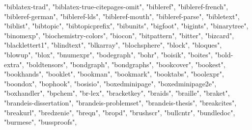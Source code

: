 \documentclass[
]{article}
\newenvironment{Shaded}{\begin{snugshade}}{\end{snugshade}}
\newcommand{\NormalTok}[1]{#1}
\newcommand{\StringTok}[1]{\textcolor[rgb]{0.31,0.60,0.02}{#1}}
\begin{document}
\begin{Shaded}
\begin{Highlighting}[]
\StringTok{"biblatex{-}trad"}\NormalTok{, }\StringTok{"biblatex{-}true{-}citepages{-}omit"}\NormalTok{, }\StringTok{"bibleref"}\NormalTok{, }
\StringTok{"bibleref{-}french"}\NormalTok{, }\StringTok{"bibleref{-}german"}\NormalTok{, }\StringTok{"bibleref{-}lds"}\NormalTok{, }\StringTok{"bibleref{-}mouth"}\NormalTok{, }
\StringTok{"bibleref{-}parse"}\NormalTok{, }\StringTok{"bibletext"}\NormalTok{, }\StringTok{"biblist"}\NormalTok{, }\StringTok{"bibtopic"}\NormalTok{, }\StringTok{"bibtopicprefix"}\NormalTok{, }
\StringTok{"bibunits"}\NormalTok{, }\StringTok{"bigfoot"}\NormalTok{, }\StringTok{"bigints"}\NormalTok{, }\StringTok{"binarytree"}\NormalTok{, }\StringTok{"binomexp"}\NormalTok{, }\StringTok{"biochemistry{-}colors"}\NormalTok{, }
\StringTok{"biocon"}\NormalTok{, }\StringTok{"bitpattern"}\NormalTok{, }\StringTok{"bitter"}\NormalTok{, }\StringTok{"bizcard"}\NormalTok{, }\StringTok{"blacklettert1"}\NormalTok{, }
\StringTok{"blindtext"}\NormalTok{, }\StringTok{"blkarray"}\NormalTok{, }\StringTok{"blochsphere"}\NormalTok{, }\StringTok{"block"}\NormalTok{, }\StringTok{"bloques"}\NormalTok{, }\StringTok{"blowup"}\NormalTok{, }
\StringTok{"blox"}\NormalTok{, }\StringTok{"bnumexpr"}\NormalTok{, }\StringTok{"bodegraph"}\NormalTok{, }\StringTok{"bohr"}\NormalTok{, }\StringTok{"boisik"}\NormalTok{, }\StringTok{"boites"}\NormalTok{, }
\StringTok{"bold{-}extra"}\NormalTok{, }\StringTok{"boldtensors"}\NormalTok{, }\StringTok{"bondgraph"}\NormalTok{, }\StringTok{"bondgraphs"}\NormalTok{, }\StringTok{"bookcover"}\NormalTok{, }
\StringTok{"bookest"}\NormalTok{, }\StringTok{"bookhands"}\NormalTok{, }\StringTok{"booklet"}\NormalTok{, }\StringTok{"bookman"}\NormalTok{, }\StringTok{"bookmark"}\NormalTok{, }\StringTok{"booktabs"}\NormalTok{, }
\StringTok{"boolexpr"}\NormalTok{, }\StringTok{"boondox"}\NormalTok{, }\StringTok{"bophook"}\NormalTok{, }\StringTok{"bosisio"}\NormalTok{, }\StringTok{"boxedminipage"}\NormalTok{, }
\StringTok{"boxedminipage2e"}\NormalTok{, }\StringTok{"boxhandler"}\NormalTok{, }\StringTok{"bpchem"}\NormalTok{, }\StringTok{"br{-}lex"}\NormalTok{, }\StringTok{"bracketkey"}\NormalTok{, }
\StringTok{"braids"}\NormalTok{, }\StringTok{"braille"}\NormalTok{, }\StringTok{"braket"}\NormalTok{, }\StringTok{"brandeis{-}dissertation"}\NormalTok{, }\StringTok{"brandeis{-}problemset"}\NormalTok{, }
\StringTok{"brandeis{-}thesis"}\NormalTok{, }\StringTok{"breakcites"}\NormalTok{, }\StringTok{"breakurl"}\NormalTok{, }\StringTok{"bredzenie"}\NormalTok{, }\StringTok{"breqn"}\NormalTok{, }
\StringTok{"bropd"}\NormalTok{, }\StringTok{"brushscr"}\NormalTok{, }\StringTok{"bullcntr"}\NormalTok{, }\StringTok{"bundledoc"}\NormalTok{, }\StringTok{"burmese"}\NormalTok{, }\StringTok{"bussproofs"}\NormalTok{, }

\end{Highlighting}
\end{Shaded}
\end{document}
